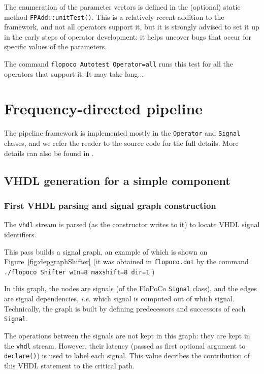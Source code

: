 \documentclass{article}
\begin{document}
The enumeration of the parameter vectors is defined in the (optional) static method \texttt{FPAdd::unitTest()}.
This is a relatively recent addition to the framework, and not all operators support it, but it is strongly advised to set it up in the early steps of operator development: it helps uncover bugs that occur for specific values of the parameters.

The command \verb!flopoco Autotest Operator=all! runs this test for all the operators that support it.
It may take long...




\section{Frequency-directed pipeline \label{sec:pipeline}}

The  pipeline framework  is implemented mostly in the \texttt{Operator} and \texttt{Signal} classes, and we refer the reader to the source code for the full  details.
More details can also be found in \cite{istoan:hal-01373937}.

\subsection{VHDL generation for a simple component}

\subsubsection{First VHDL parsing and signal graph construction}
The \texttt{vhdl} stream is parsed (as the constructor writes to it) to locate VHDL signal identifiers.

This pass builds  a signal graph, an example of which is shown on Figure~\ref{fig:depgraphShifter} 
(it was obtained in \texttt{flopoco.dot} by the command
\verb!./flopoco Shifter wIn=8 maxshift=8 dir=1! )

In this graph, the nodes are signals (of the FloPoCo \texttt{Signal} class), and the edges are signal dependencies, \emph{i.e.} which signal is computed out of which signal.
Technically, the graph is built by defining predecessors and successors of each \texttt{Signal}.

The operations between the signals are not kept in this graph: they are kept in the \texttt{vhdl} stream.
  However, their latency (passed as first optional argument to  \texttt{declare()}) is used to label each signal.
  This value decribes the contribution of this VHDL statement to the critical path.
\end{document}

